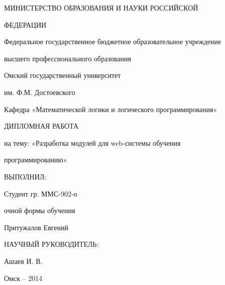 \thispagestyle{empty}
\large
\begin{center}
МИНИСТЕРСТВО ОБРАЗОВАНИЯ И НАУКИ РОССИЙСКОЙ \par
ФЕДЕРАЦИИ\par 
\vspace{6mm}
Федеральное государственное бюджетное образовательное учреждение\par 
высшего профессионального образования\par 
\vspace{6mm}
Омский государственный университет\par 
им. Ф.М. Достоевского\par 
\vspace{6mm}
Кафедра «Математической логики и логического программирования»\par 
\vspace{6mm}
ДИПЛОМНАЯ РАБОТА\par
на тему: «Разработка модулей для web-системы обучения\par программированию»\par


\end{center}

\vspace{36mm}
\begin{flushright}

ВЫПОЛНИЛ:\par
Студент гр. ММС-902-о\par
очной формы обучения\par
Притужалов Евгений\par

\vspace{6mm}
НАУЧНЫЙ РУКОВОДИТЕЛЬ: \par
Ашаев И. В.\par


\end{flushright}


\vspace{60mm}
\begin{center}
{Омск -- 2014}
\end{center}

\newpage
